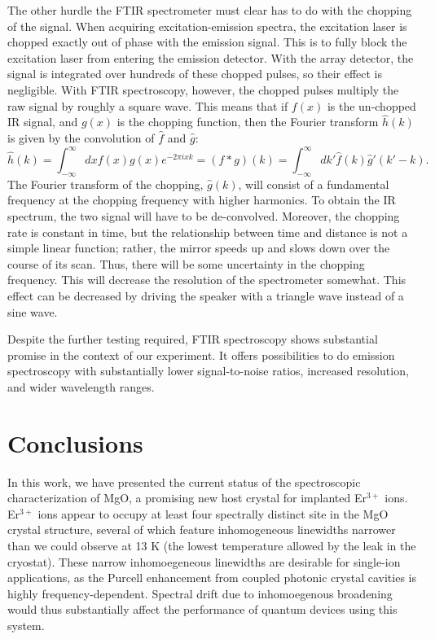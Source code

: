 \documentclass[12pt]{report}
\newcommand{\erbium}[1][ ]{Er$^{3+}$#1}
\begin{document}
The other hurdle the FTIR spectrometer must clear has to do with the chopping of the signal. When acquiring excitation-emission spectra, the excitation laser is chopped exactly out of phase with the emission signal. This is to fully block the excitation laser from entering the emission detector. With the array detector, the signal is integrated over hundreds of these chopped pulses, so their effect is negligible. With FTIR spectroscopy, however, the chopped pulses multiply the raw signal by roughly a square wave. This means that if $f(x)$ is the un-chopped IR signal, and $g(x)$ is the chopping function, then the Fourier transform $\hat{h}(k)$ is given by the convolution of $\hat{f}$ and $\hat{g}$:
\begin{equation}\label{eq:15}
\hat{h}(k) = \int_{-\infty}^{\infty}dxf(x)g(x)e^{-2\pi i x k} = (f * g)(k) = \int_{-\infty}^{\infty}dk'\hat{f}(k)\hat{g}'(k'-k).
\end{equation}
The Fourier transform of the chopping, $\hat{g}(k)$, will consist of a fundamental frequency at the chopping frequency with higher harmonics. To obtain the IR spectrum, the two signal will have to be de-convolved. Moreover, the chopping rate is constant in time, but the relationship between time and distance is not a simple linear function; rather, the mirror speeds up and slows down over the course of its scan. Thus, there will be some uncertainty in the chopping frequency. This will decrease the resolution of the spectrometer somewhat. This effect can be decreased by driving the speaker with a triangle wave instead of a sine wave.

Despite the further testing required, FTIR spectroscopy shows substantial promise in the context of our experiment. It offers possibilities to do emission spectroscopy with substantially lower signal-to-noise ratios, increased resolution, and wider wavelength ranges.


\newpage
\makeatletter
\patchcmd{\chaptermark}{\@chapapp\ }{}{}{}
\makeatother
\fancyhead{}
\fancyhead[RO,LE]{\nouppercase{\leftmark}} %
\chapter{Conclusions}


In this work, we have presented the current status of the spectroscopic characterization of MgO, a promising new host crystal for implanted \erbium ions. \erbium ions appear to occupy at least four spectrally distinct site in the MgO crystal structure, several of which feature inhomogeneous linewidths narrower than we could observe at 13 K (the lowest temperature allowed by the leak in the cryostat). These narrow inhomoegeneous linewidths are desirable for single-ion applications, as the Purcell enhancement from coupled photonic crystal cavities is highly frequency-dependent. Spectral drift due to inhomoegenous broadening would thus substantially affect the performance of quantum devices using this system.
\end{document}
